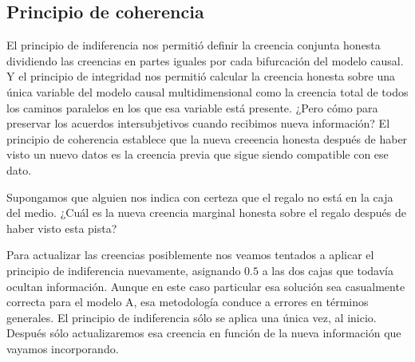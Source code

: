 \documentclass[a4paper,10pt]{book}
\theoremstyle{definition}
\begin{document}
\subsection{Principio de coherencia} \label{sec:principio_choerencia} %

El principio de indiferencia nos permitió definir la creencia conjunta honesta dividiendo las creencias en partes iguales por cada bifurcación del modelo causal.
%
Y el principio de integridad nos permitió calcular la creencia honesta sobre una única variable del modelo causal multidimensional como la creencia total de todos los caminos paralelos en los que esa variable está presente.
%
¿Pero cómo para preservar los acuerdos intersubjetivos cuando recibimos nueva información?
%
El principio de coherencia establece que la nueva creeencia honesta después de haber visto un nuevo datos es la creencia previa que sigue siendo compatible con ese dato.


Supongamos que alguien nos indica con certeza que el regalo no está en la caja del medio.
%
¿Cuál es la nueva creencia marginal honesta sobre el regalo después de haber visto esta pista?


\begin{figure}[ht!]
\centering
{} 
\end{figure}


Para actualizar las creencias posiblemente nos veamos tentados a aplicar el principio de indiferencia nuevamente, asignando $0.5$ a las dos cajas que todavía ocultan información.
%
Aunque en este caso particular esa solución sea casualmente correcta para el modelo A, esa metodología conduce a errores en términos generales.
%
El principio de indiferencia sólo se aplica una única vez, al inicio.
%
Después sólo actualizaremos esa creencia en función de la nueva información que vayamos incorporando.
\end{document}
